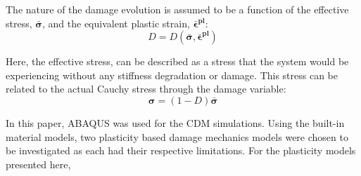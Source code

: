 The nature of the damage evolution is assumed to be a function of the effective stress, $\boldsymbol{\bar{\sigma}}$, and the equivalent plastic strain, $\boldsymbol{\bar{\epsilon}^{pl}}$:
\begin{equation}
D=D(\boldsymbol{\bar{\sigma}},\boldsymbol{\bar{\epsilon}^{pl}})\label{eqn:const8}
\end{equation}



Here, the effective stress,  can be described as a stress that the system would be experiencing without any stiffness degradation or damage. This stress can be related to the actual Cauchy stress through the damage variable: 
\begin{equation}
\boldsymbol{\sigma}=(1-D)\boldsymbol{\bar{\sigma}}\label{eqn:const7}
\end{equation}

In this paper, ABAQUS was used for the CDM simulations. Using the built-in material models, two plasticity based damage mechanics models were chosen to be investigated as each had their respective limitations. For the plasticity models presented here, 



